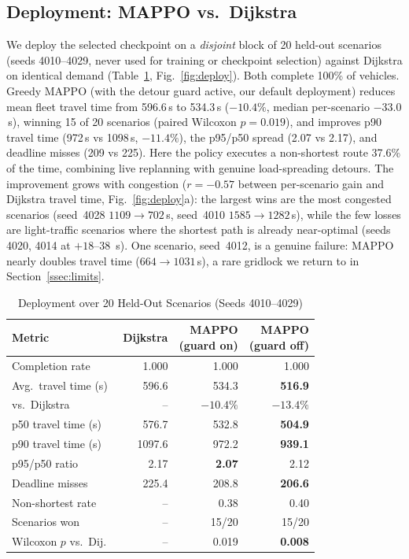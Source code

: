 \subsection{Deployment: MAPPO vs.\ Dijkstra}
We deploy the selected checkpoint on a \emph{disjoint} block of 20 held-out scenarios
(seeds 4010--4029, never used for training or checkpoint selection) against Dijkstra on
identical demand (Table~\ref{tab:deploy}, Fig.~\ref{fig:deploy}). Both complete 100\% of
vehicles. Greedy MAPPO (with the detour guard active, our default deployment) reduces mean
fleet travel time from 596.6\,s to 534.3\,s ($-10.4\%$, median per-scenario $-33.0$\,s),
winning 15 of 20 scenarios (paired Wilcoxon $p{=}0.019$), and improves p90 travel time
(972\,s vs 1098\,s, $-11.4\%$), the p95/p50 spread (2.07 vs 2.17), and deadline misses (209
vs 225). Here the policy executes a non-shortest route 37.6\% of the time, combining live
replanning with genuine load-spreading detours. The improvement grows with
congestion ($r{=}-0.57$ between per-scenario gain and Dijkstra travel time,
Fig.~\ref{fig:deploy}a): the largest wins are the most congested scenarios (seed~4028
$1109\to702$\,s, seed~4010 $1585\to1282$\,s), while the few losses are light-traffic
scenarios where the shortest path is already near-optimal (seeds 4020, 4014 at $+18$--$38$
\,s). One scenario, seed~4012, is a genuine failure: MAPPO nearly doubles travel time
($664\to1031$\,s), a rare gridlock we return to in Section~\ref{ssec:limits}.

\begin{table}[!t]
\caption{Deployment over 20 Held-Out Scenarios (Seeds 4010--4029)}
\label{tab:deploy}
\centering
\footnotesize
\setlength{\tabcolsep}{3.4pt}
\begin{tabular}{lrrr}
\toprule
Metric & Dijkstra & \shortstack[r]{MAPPO\\(guard on)} & \shortstack[r]{MAPPO\\(guard off)} \\
\midrule
Completion rate       & 1.000 & 1.000 & 1.000 \\
Avg.\ travel time (s) & 596.6 & 534.3 & \textbf{516.9} \\
\quad vs.\ Dijkstra   & --    & $-10.4\%$ & $\mathbf{-13.4\%}$ \\
p50 travel time (s)   & 576.7 & 532.8 & \textbf{504.9} \\
p90 travel time (s)   & 1097.6 & 972.2 & \textbf{939.1} \\
p95/p50 ratio         & 2.17  & \textbf{2.07}  & 2.12 \\
Deadline misses       & 225.4 & 208.8 & \textbf{206.6} \\
Non-shortest rate     & --    & 0.38  & 0.40 \\
Scenarios won         & --    & 15/20 & 15/20 \\
Wilcoxon $p$ vs.\ Dij.\ & --  & 0.019 & \textbf{0.008} \\
\bottomrule
\end{tabular}
\end{table}


